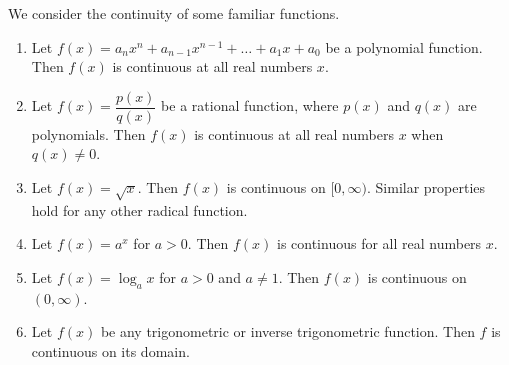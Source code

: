\documentclass{book}
\begin{document}
\begin{Thm} We consider the continuity of some familiar functions.\\
\begin{enumerate}
\item Let $f(x) = a_nx^n + a_{n-1}x^{n-1} + \ldots + a_1x + a_0$ be a polynomial function. Then $f(x)$ is continuous at all real numbers $x$.

\item Let $f(x) = \dfrac{p(x)}{q(x)}$ be a rational function, where $p(x)$ and $q(x)$ are polynomials. Then $f(x)$ is continuous at all real numbers $x$ when $q(x)\neq 0$.

\item Let $f(x) = \sqrt{x}$. Then $f(x)$ is continuous on $[0,\infty)$. Similar properties hold for any other radical function.

\item Let $f(x) = a^x$ for $a > 0$. Then $f(x)$ is continuous for all real numbers $x$.

\item Let $f(x) = \log_a x$ for $a > 0$ and $a\neq 1$. Then $f(x)$ is continuous on $(0,\infty)$.

\item Let $f(x)$ be any trigonometric or inverse trigonometric function. Then $f$ is continuous on its domain.
\end{enumerate}
\end{Thm}
\vs
 
\end{document}

